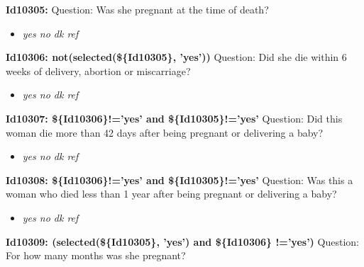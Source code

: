\documentclass{article}%
\begin{document}
\textbf{Id10305: \newline%
}%
Question: Was she pregnant at the time of death?\newline%
%
\begin{itemize}%
\item%
\textit{yes\newline%
 no\newline%
 dk\newline%
 ref\newline%
}%
\end{itemize}%
\textbf{Id10306: not(selected(\$\{Id10305\}, 'yes'))\newline%
}%
Question: Did she die within 6 weeks of delivery, abortion or miscarriage?\newline%
%
\begin{itemize}%
\item%
\textit{yes\newline%
 no\newline%
 dk\newline%
 ref\newline%
}%
\end{itemize}%
\textbf{Id10307: \$\{Id10306\}!='yes' and  \$\{Id10305\}!='yes'\newline%
}%
Question: Did this woman die more than 42 days after being pregnant or delivering a baby?\newline%
%
\begin{itemize}%
\item%
\textit{yes\newline%
 no\newline%
 dk\newline%
 ref\newline%
}%
\end{itemize}%
\textbf{Id10308: \$\{Id10306\}!='yes' and  \$\{Id10305\}!='yes'\newline%
}%
Question: Was this a woman who died less than 1 year after being pregnant or delivering a baby?\newline%
%
\begin{itemize}%
\item%
\textit{yes\newline%
 no\newline%
 dk\newline%
 ref\newline%
}%
\end{itemize}%
\textbf{Id10309: (selected(\$\{Id10305\}, 'yes') and \$\{Id10306\} !='yes')\newline%
}%
Question: For how many months was she pregnant?\newline%
\end{document}
